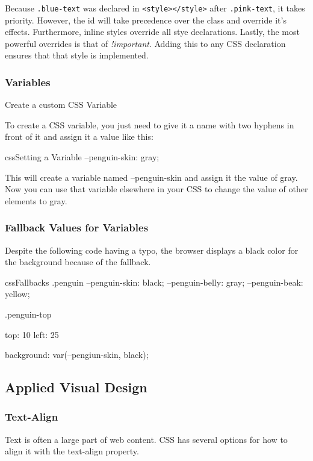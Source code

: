 Because \texttt{.blue-text} was declared in \texttt{<style></style>} after \texttt{.pink-text}, it takes priority. However, the id will take precedence over the class and override it's effects. Furthermore, inline styles override all stye declarations. Lastly, the most powerful overrides is that of \emph{!important}. Adding this to any CSS declaration ensures that that style is implemented.

\subsubsection{Variables}
Create a custom CSS Variable

To create a CSS variable, you just need to give it a name with two hyphens in front of it and assign it a value like this:
\begin{codeBlock}{css}{Setting a Variable}
--penguin-skin: gray;
\end{codeBlock}

This will create a variable named --penguin-skin and assign it the value of gray. Now you can use that variable elsewhere in your CSS to change the value of other elements to gray.

\subsubsection{Fallback Values for Variables}

Despite the following code having a typo, the browser displays a black color for the background because of the fallback.
\begin{codeBlock}{css}{Fallbacks}
  .penguin {
    --penguin-skin: black;
    --penguin-belly: gray;
    --penguin-beak: yellow;
  }

  .penguin-top {
    top: 10%
    left: 25%

    background: var(--pengiun-skin, black);
  }
\end{codeBlock}

\subsection{Applied Visual Design}
\subsubsection{Text-Align}
Text is often a large part of web content. CSS has several options for how to align it with the text-align property.

